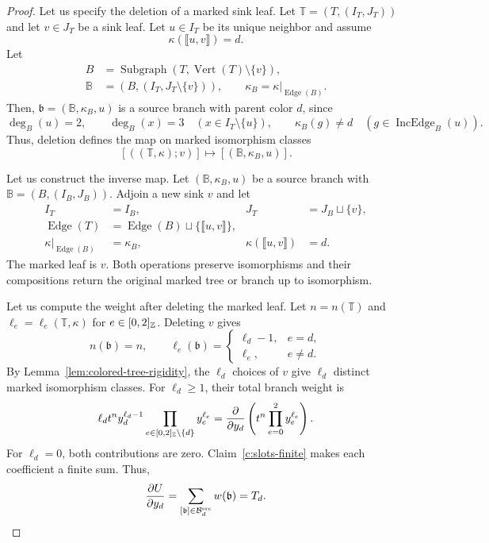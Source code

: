 \begin{proof}
 Let us specify the deletion of a marked sink leaf.
Let $\mathbb T=(T,(I_T,J_T))$ and let $v\in J_T$ be a sink leaf.
Let $u\in I_T$ be its unique neighbor and assume
\[
 \kappa(\llbracket u,v\rrbracket)=d.
\]
Let
\[
\begin{aligned}
 B&=\operatorname{Subgraph}(T,\operatorname{Vert}(T)\setminus\{v\}),\\
 \mathbb B&=(B,(I_T,J_T\setminus\{v\})),\qquad
 \kappa_B=\kappa|_{\operatorname{Edge}(B)}.
\end{aligned}
\]
Then, $\mathfrak b=(\mathbb B,\kappa_B,u)$ is a source branch with parent color $d$, since
\[
 \deg_B(u)=2,\qquad
 \deg_B(x)=3\quad(x\in I_T\setminus\{u\}),\qquad
 \kappa_B(g)\ne d\quad(g\in\operatorname{IncEdge}_B(u)).
\]
Thus, deletion defines the map on marked isomorphism classes
\[
 [((\mathbb T,\kappa);v)]\longmapsto[(\mathbb B,\kappa_B,u)].
\]

Let us construct the inverse map.
Let $(\mathbb B,\kappa_B,u)$ be a source branch with $\mathbb B=(B,(I_B,J_B))$.
Adjoin a new sink $v$ and let
\[
\begin{aligned}
 I_T&=I_B,&J_T&=J_B\sqcup\{v\},\\
 \operatorname{Edge}(T)&=\operatorname{Edge}(B)\sqcup\{\llbracket u,v\rrbracket\},&&\\
 \kappa|_{\operatorname{Edge}(B)}&=\kappa_B,&
 \kappa(\llbracket u,v\rrbracket)&=d.
\end{aligned}
\]
The marked leaf is $v$.
Both operations preserve isomorphisms and their compositions return the original marked tree or branch up to isomorphism.

Let us compute the weight after deleting the marked leaf.
Let $n=n(\mathbb T)$ and $\ell_e=\ell_e(\mathbb T,\kappa)$ for $e\in[0,2]_{\mathbb Z}$.
Deleting $v$ gives
\[
 n(\mathfrak b)=n,\qquad
 \ell_e(\mathfrak b)=
 \begin{cases}
 \ell_d-1,&e=d,\\
 \ell_e,&e\ne d.
 \end{cases}
\]
By Lemma~\ref{lem:colored-tree-rigidity}, the $\ell_d$ choices of $v$ give $\ell_d$ distinct marked isomorphism classes.
For $\ell_d\ge1$, their total branch weight is
\[
 \ell_d t^n y_d^{\ell_d-1}
 \prod_{e\in[0,2]_{\mathbb Z}\setminus\{d\}}y_e^{\ell_e}
 =\frac{\partial}{\partial y_d}
   \left(t^n\prod_{e=0}^2y_e^{\ell_e}\right).
\]
For $\ell_d=0$, both contributions are zero.
Claim~\ref{c:slots-finite} makes each coefficient a finite sum. Thus,
\[
 \frac{\partial U}{\partial y_d}
 =\sum_{[\mathfrak b]\in\mathcal B_d^{\mathrm{src}}}w(\mathfrak b)
 =T_d.\qedhere
\]
\end{proof}

